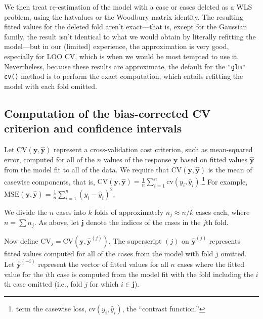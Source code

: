 \documentclass[
]{jss}
\begin{document}
We then treat re-estimation of the model with a case or cases deleted as
a WLS problem, using the hatvalues or the Woodbury matrix identity. The
resulting fitted values for the deleted fold aren't exact---that is,
except for the Gaussian family, the result isn't identical to what we
would obtain by literally refitting the model---but in our (limited)
experience, the approximation is very good, especially for LOO CV, which
is when we would be most tempted to use it. Nevertheless, because these
results are approximate, the default for the \texttt{"glm"}
\texttt{cv()} method is to perform the exact computation, which entails
refitting the model with each fold omitted.

\hypertarget{computation-of-the-bias-corrected-cv-criterion-and-confidence-intervals}{%
\subsection{Computation of the bias-corrected CV criterion and
confidence
intervals}\label{computation-of-the-bias-corrected-cv-criterion-and-confidence-intervals}}

Let \(\mathrm{CV}(\mathbf{y}, \widehat{\mathbf{y}})\) represent a
cross-validation cost criterion, such as mean-squared error, computed
for all of the \(n\) values of the response \(\mathbf{y}\) based on
fitted values \(\widehat{\mathbf{y}}\) from the model fit to all of the
data. We require that \(\mathrm{CV}(\mathbf{y}, \widehat{\mathbf{y}})\)
is the mean of casewise components, that is,
\(\mathrm{CV}(\mathbf{y}, \widehat{\mathbf{y}}) = \frac{1}{n}\sum_{i=1}^n\mathrm{cv}(y_i, \widehat{y}_i)\).\footnote{\citet{ArlotCelisse:2010}
  term the casewise loss, \(\mathrm{cv}(y_i, \widehat{y}_i)\), the
  ``contrast function.''} For example,
\(\mathrm{MSE}(\mathbf{y}, \widehat{\mathbf{y}}) = \frac{1}{n}\sum_{i=1}^n (y_i - \widehat{y}_i)^2\).

We divide the \(n\) cases into \(k\) folds of approximately
\(n_j \approx n/k\) cases each, where \(n = \sum n_j\). As above, let
\(\mathbf{j}\) denote the indices of the cases in the \(j\)th fold.

Now define
\(\mathrm{CV}_j = \mathrm{CV}(\mathbf{y}, \widehat{\mathbf{y}}^{(j)})\).
The superscript \((j)\) on \(\widehat{\mathbf{y}}^{(j)}\) represents
fitted values computed for all of the cases from the model with fold
\(j\) omitted. Let \(\widehat{\mathbf{y}}^{(-i)}\) represent the vector
of fitted values for all \(n\) cases where the fitted value for the
\(i\)th case is computed from the model fit with the fold including the
\(i\)th case omitted (i.e., fold \(j\) for which \(i \in \mathbf{j}\)).
\end{document}
